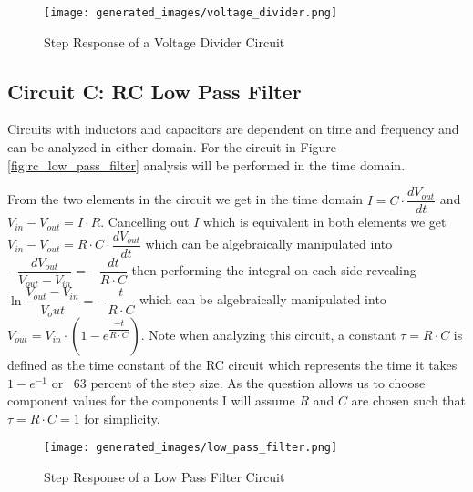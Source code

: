 \documentclass[main.tex]{subfiles}
\begin{document}
\begin{figure}[H]
    \centering
    \texttt{[image: generated\_images/voltage\_divider.png]}
    \caption{Step Response of a Voltage Divider Circuit}
    \label{fig:step-response-voltage-divider}
\end{figure}

\subsection{Circuit C: RC Low Pass Filter}
Circuits with inductors and capacitors are dependent on time and frequency and can be analyzed in either domain. For the circuit in Figure \ref{fig:rc_low_pass_filter} analysis will be performed in the time domain. \newline

\newnoindentpara From the two elements in the circuit we get in the time domain $I = C \cdot \dfrac{dV_{out}}{dt}$ and $V_{in} - V_{out} = I \cdot R$. Cancelling out $I$ which is equivalent in both elements we get $V_{in} - V_{out} = R \cdot C \cdot \dfrac{dV_{out}}{dt}$ which can be algebraically manipulated into $-\dfrac{dV_{out}}{V_{out}-V_{in}} = -\dfrac{dt}{R \cdot C}$ then performing the integral on each side revealing $\ln{\dfrac{V_{out}-V_{in}}{V_out}}=-\dfrac{t}{R \cdot C}$ which can be algebraically manipulated into $V_{out}=V_{in} \cdot (1-e^{\dfrac{-t}{R \cdot C}})$. Note when analyzing this circuit, a constant $\tau = R \cdot C$ is defined as the time constant of the RC circuit which represents the time it takes $1-e^{-1}$ or ~63 percent of the step size. As the question allows us to choose component values for the components I will assume $R$ and $C$ are chosen such that $\tau = R \cdot C = 1$ for simplicity.

\begin{figure}[H]
    \centering
    \texttt{[image: generated\_images/low\_pass\_filter.png]}
    \caption{Step Response of a Low Pass Filter Circuit}
    \label{fig:step-response-low-pass-filter}
\end{figure}
\end{document}
